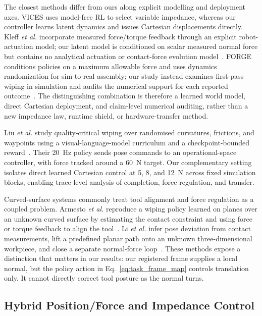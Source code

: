The closest methods differ from ours along explicit modelling and deployment
axes. VICES uses model-free RL to select variable impedance, whereas our
controller learns latent dynamics and issues Cartesian displacements directly.
Kleff \emph{et al.} incorporate measured force/torque feedback through an explicit
robot-actuation model; our latent model is conditioned on scalar measured
normal force but contains no analytical actuation or contact-force evolution
model~\cite{kleff2022forcefeedbackmpc}. FORGE conditions policies on a maximum
allowable force and uses dynamics randomization for sim-to-real assembly;
our study instead examines first-pass wiping in simulation and audits the
numerical support for each reported outcome~\cite{noseworthy2025forge}. The
distinguishing combination is therefore a learned world model, direct Cartesian
deployment, and claim-level numerical auditing, rather than a new impedance
law, runtime shield, or hardware-transfer method.

Liu \emph{et al.} study quality-critical wiping over randomised curvatures,
frictions, and waypoints using a visual-language-model curriculum and a
checkpoint-bounded reward~\cite{liu2025wipingvlm}. Their 20~Hz policy sends
pose commands to an operational-space controller, with force tracked around a
60~N target. Our complementary setting isolates direct learned Cartesian
control at 5, 8, and 12~N across fixed simulation blocks, enabling trace-level
analysis of completion, force regulation, and transfer.

Curved-surface systems commonly treat tool alignment and force regulation as
a coupled problem. Armesto \emph{et al.} reproduce a wiping policy learned on
planes over an unknown curved surface by estimating the contact constraint and
using force or torque feedback to align the tool~\cite{armesto2018constraintaware}.
Li \emph{et al.} infer pose deviation from contact measurements, lift a
predefined planar path onto an unknown three-dimensional workpiece, and close
a separate normal-force loop~\cite{li2023unknownsurface}. These methods expose
a distinction that matters in our results: our registered frame supplies a
local normal, but the policy action in Eq.~\eqref{eq:task_frame_map} controls
translation only. It cannot directly correct tool posture as the normal turns.

\subsection{Hybrid Position/Force and Impedance Control}

